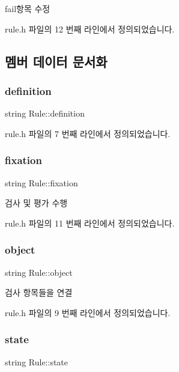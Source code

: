 fail항목 수정 

rule.\+h 파일의 12 번째 라인에서 정의되었습니다.



\subsection{멤버 데이터 문서화}
\mbox{\label{struct_rule_a0b8d9364680bd6b50577c8be0d14903b}} 
\subsubsection{\texorpdfstring{definition}{definition}}
{\footnotesize\ttfamily string Rule\+::definition}



rule.\+h 파일의 7 번째 라인에서 정의되었습니다.

\mbox{\label{struct_rule_aee3e02b0da6debc39e4e7806c6d36338}} 
\subsubsection{\texorpdfstring{fixation}{fixation}}
{\footnotesize\ttfamily string Rule\+::fixation}

검사 및 평가 수행 

rule.\+h 파일의 11 번째 라인에서 정의되었습니다.

\mbox{\label{struct_rule_a96fb9817712ad0b33d4e407be0257b5c}} 
\subsubsection{\texorpdfstring{object}{object}}
{\footnotesize\ttfamily string Rule\+::object}

검사 항목들을 연결 

rule.\+h 파일의 9 번째 라인에서 정의되었습니다.

\mbox{\label{struct_rule_ad8a0f697b716c6f7607bda36887009ef}} 
\subsubsection{\texorpdfstring{state}{state}}
{\footnotesize\ttfamily string Rule\+::state}

